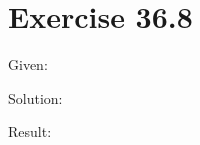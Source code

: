 \documentclass[a4paper, 10pt]{scrartcl}
\begin{document}
\section{Exercise 36.8}

Given:

Solution:

Result:
\end{document}
